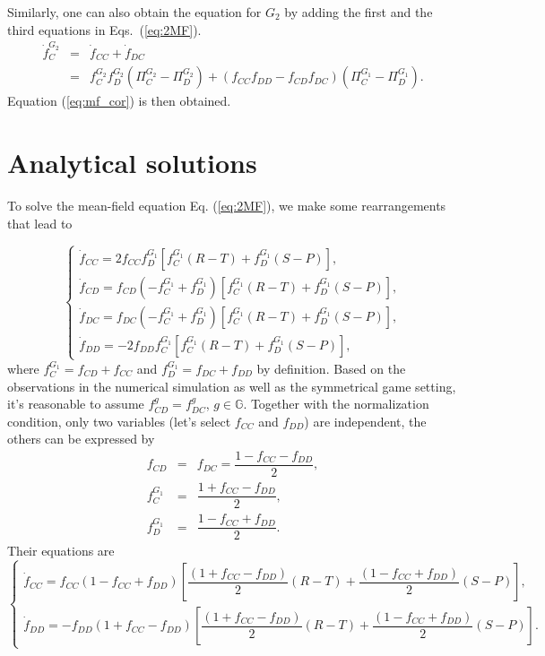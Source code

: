 \documentclass[showpacs,superscriptaddress,reprint,nofootinbib,amsmath,amssymb,aps,pre]{revtex4-1}
\begin{document}
\begin{widetext}
Similarly, one can also obtain the equation for $G_2$ by adding the first and the third equations in Eqs.~(\ref{eq:2MF}).
\begin{eqnarray}
\dot{{f}}^{G_2}_{C}&=&\dot{f}_{CC}+\dot{f}_{DC} \nonumber \\
                             & = & f^{G_2}_{C}f^{G_2}_{D}(\Pi^{G_2}_C-\Pi^{G_2}_D) + (f_{CC}f_{DD}-f_{CD}f_{DC})(\Pi^{G_1}_C-\Pi^{G_1}_D).\label{2MF2}
\end{eqnarray}
Equation (\ref{eq:mf_cor}) is then obtained. 

\section{Analytical solutions}\label{app:B}
\setcounter{equation}{0}
\renewcommand{\theequation}{B\arabic{equation}}
To solve the mean-field equation Eq. (\ref{eq:2MF}), we make some rearrangements that lead to

\begin{equation}
     \left\{
                \begin{array}{ll}
                  \dot{f}_{CC} =  2f_{CC}f^{G_1}_{D}[f^{G_1}_{C}(R-T)+f^{G_1}_{D}(S-P)],\\
                  \dot{f}_{CD} = f_{CD}(-f^{G_1}_{C}+f^{G_1}_{D})[f^{G_1}_{C}(R-T)+f^{G_1}_{D}(S-P)], \\
                  \dot{f}_{DC} = f_{DC}(-f^{G_1}_{C}+f^{G_1}_{D})[f^{G_1}_{C}(R-T)+f^{G_1}_{D}(S-P)],\\
                  \dot{f}_{DD} = -2f_{DD}f^{G_1}_{C}[f^{G_1}_{C}(R-T)+f^{G_1}_{D}(S-P)],
                \end{array}
              \right. 
\end{equation}
where $f^{G_1}_C=f_{CD}+f_{CC}$ and $f^{G_1}_D=f_{DC}+f_{DD}$ by definition.  Based on the observations in the numerical simulation as well as the symmetrical game setting, it's reasonable to assume $f^g_{CD}=f^g_{DC}$, $g\in \mathbb{G}$.
Together with the normalization condition, only two  variables (let's select $f_{CC}$ and $f_{DD}$) are independent, the others can be expressed by
\begin{eqnarray}
 f_{CD}&=&f_{DC}=\dfrac{1-f_{CC}-f_{DD}}{2},\\
 f^{G_1}_{C}&=&\dfrac{1+f_{CC}-f_{DD}}{2},\\
 f^{G_1}_{D}&=&\dfrac{1-f_{CC}+f_{DD}}{2}.
\end{eqnarray}
Their equations are
\begin{equation}
     \left\{
                \begin{array}{ll}
                \dot{f}_{CC}=f_{CC}(1-f_{CC}+f_{DD})[\dfrac{(1+f_{CC}-f_{DD})}{2}(R-T)+\dfrac{(1-f_{CC}+f_{DD})}{2}(S-P)],\\
                \dot{f}_{DD}=-f_{DD}(1+f_{CC}-f_{DD})[\dfrac{(1+f_{CC}-f_{DD})}{2}(R-T)+\dfrac{(1-f_{CC}+f_{DD})}{2}(S-P)].
                \end{array}
              \right. 
\end{equation}
 

\end{widetext}
\end{document}
